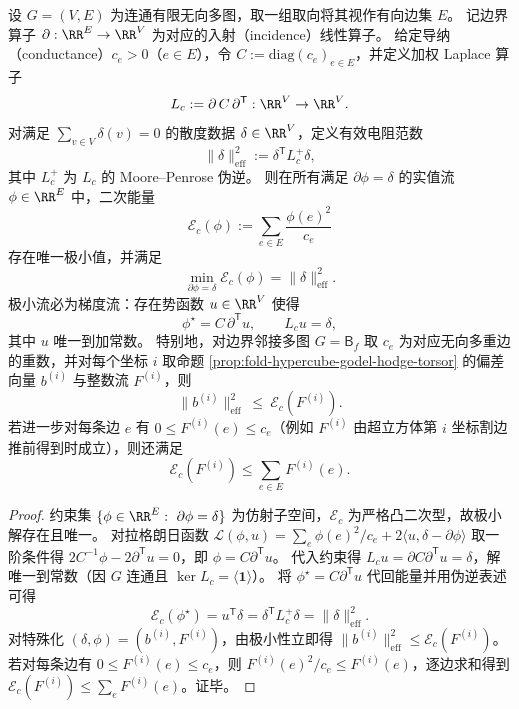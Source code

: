\begin{theorem}[边界邻接多图的有效电阻范数与最小能量原理]\label{thm:fold-hypercube-boundary-multigraph-effective-resistance-min-energy}
设 \(G=(V,E)\) 为连通有限无向多图，取一组取向将其视作有向边集 \(E\)。
记边界算子 \(\partial:\RR^{E}\to \RR^{V}\) 为对应的入射（incidence）线性算子。
给定导纳（conductance）\(c_e>0\)（\(e\in E\)），令 \(C:=\mathrm{diag}(c_e)_{e\in E}\)，并定义加权 Laplace 算子
\[
L_c:=\partial\,C\,\partial^{\mathsf T}:\RR^{V}\to \RR^{V}.
\]
对满足 \(\sum_{v\in V}\delta(v)=0\) 的散度数据 \(\delta\in\RR^{V}\)，定义有效电阻范数
\[
\|\delta\|_{\mathrm{eff}}^{2}:=\delta^{\mathsf T}L_c^{+}\delta,
\]
其中 \(L_c^{+}\) 为 \(L_c\) 的 Moore--Penrose 伪逆。
则在所有满足 \(\partial\phi=\delta\) 的实值流 \(\phi\in\RR^{E}\) 中，二次能量
\[
\mathcal E_c(\phi):=\sum_{e\in E}\frac{\phi(e)^2}{c_e}
\]
存在唯一极小值，并满足
\[
\boxed{\;\min_{\partial\phi=\delta}\mathcal E_c(\phi)=\|\delta\|_{\mathrm{eff}}^{2}.\;}
\]
极小流必为梯度流：存在势函数 \(u\in\RR^{V}\) 使得
\[
\phi^\star=C\,\partial^{\mathsf T}u,
\qquad
L_cu=\delta,
\]
其中 \(u\) 唯一到加常数。
特别地，对边界邻接多图 \(G=\mathsf B_f\) 取 \(c_e\) 为对应无向多重边的重数，并对每个坐标 \(i\) 取命题 \ref{prop:fold-hypercube-godel-hodge-torsor} 的偏差向量 \(b^{(i)}\) 与整数流 \(F^{(i)}\)，则
\[
\|b^{(i)}\|_{\mathrm{eff}}^{2}\ \le\ \mathcal E_c(F^{(i)}).
\]
若进一步对每条边 \(e\) 有 \(0\le F^{(i)}(e)\le c_e\)（例如 \(F^{(i)}\) 由超立方体第 \(i\) 坐标割边推前得到时成立），则还满足
\[
\mathcal E_c(F^{(i)})\le \sum_{e\in E}F^{(i)}(e).
\]
\end{theorem}
\begin{proof}
约束集 \(\{\phi\in\RR^{E}:\ \partial\phi=\delta\}\) 为仿射子空间，\(\mathcal E_c\) 为严格凸二次型，故极小解存在且唯一。
对拉格朗日函数
\(
\mathcal L(\phi,u)=\sum_e \phi(e)^2/c_e+2\langle u,\delta-\partial\phi\rangle
\)
取一阶条件得
\(
2C^{-1}\phi-2\partial^{\mathsf T}u=0
\)，即 \(\phi=C\partial^{\mathsf T}u\)。
代入约束得 \(L_cu=\partial C\partial^{\mathsf T}u=\delta\)，解唯一到常数（因 \(G\) 连通且 \(\ker L_c=\langle \mathbf 1\rangle\)）。
将 \(\phi^\star=C\partial^{\mathsf T}u\) 代回能量并用伪逆表述可得
\[
\mathcal E_c(\phi^\star)=u^{\mathsf T}\delta=\delta^{\mathsf T}L_c^{+}\delta=\|\delta\|_{\mathrm{eff}}^{2}.
\]
对特殊化 \((\delta,\phi)=(b^{(i)},F^{(i)})\)，由极小性立即得 \(\|b^{(i)}\|_{\mathrm{eff}}^{2}\le \mathcal E_c(F^{(i)})\)。
若对每条边有 \(0\le F^{(i)}(e)\le c_e\)，则 \(F^{(i)}(e)^2/c_e\le F^{(i)}(e)\)，逐边求和得到 \(\mathcal E_c(F^{(i)})\le \sum_e F^{(i)}(e)\)。证毕。
\end{proof}

